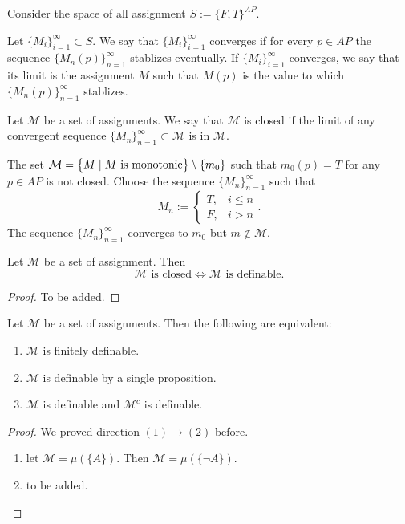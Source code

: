 \documentclass[11pt,a4paper]{article}
\begin{document}
Consider the space of all assignment $S := \{F, T\}^{AP}$.
\begin{definition}
  Let $\{M_i\}_{i=1}^{\infty} \subset S$.
  We say that $\{M_i\}_{i=1}^{\infty}$ converges if for every $p \in AP$
  the sequence $\{M_n(p)\}_{n=1}^{\infty}$ stablizes eventually.
  If $\{M_i\}_{i=1}^{\infty}$ converges, we say that its limit is
  the assignment $M$ such that $M(p)$ is the value to which
  $\{M_n(p)\}_{n=1}^{\infty}$ stablizes.
\end{definition}

\begin{definition}
  Let $\mathcal M$ be a set of assignments.
  We say that $\mathcal M$ is closed if the limit of any convergent sequence
  $\{M_n\}_{n=1}^{\infty} \subset \mathcal M$ is in $\mathcal M$.
\end{definition}

\begin{example}
  The set $\mathcal M = \left\{M \mid M \text{ is monotonic}\right\} \setminus \{m_0\}$
  such that $m_0(p) = T$ for any $p \in AP$ is not closed.
  Choose the sequence $\{M_n\}_{n=1}^{\infty}$ such that
  \[
    M_n :=
    \begin{cases}
      T, &i \le n \\
      F, &i > n
    \end{cases}.
  \]
  The sequence $\{M_n\}_{n=1}^{\infty}$ converges to $m_0$ but 
  $m \notin \mathcal M$.
\end{example}

\begin{proposition}
  Let $\mathcal M$ be a set of assignment. Then
  \[
    \mathcal M \text{ is closed} \iff
    \mathcal M \text{ is definable}.
  \]
\end{proposition}
\begin{proof}
  To be added.
\end{proof}

\begin{proposition}
  Let $\mathcal M$ be a set of assignments. Then the following are equivalent:
  \begin{enumerate}
    \item[(1)] $\mathcal M$ is finitely definable.
    \item[(2)] $\mathcal M$ is definable by a single proposition.
    \item[(3)] $\mathcal M$ is definable and $\mathcal M^c$ is definable.
  \end{enumerate}
\end{proposition}
\begin{proof}
  We proved direction $(1) \to (2)$ before.
  \begin{enumerate}
    \item[$(2) \to (3)$] let $\mathcal M = \mu(\{A\})$.
      Then $\mathcal M = \mu(\{\neg A\})$.
    \item[$(3) \to (1)$] to be added.
  \end{enumerate}
\end{proof}
\end{document}
